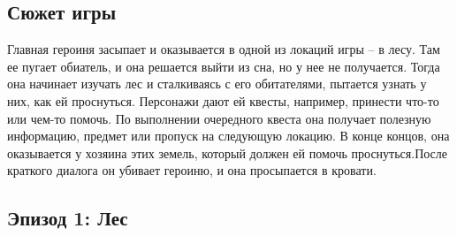 \subsection{Сюжет игры}

Главная героиня засыпает и оказывается в одной из локаций игры – в лесу. Там ее пугает обиатель, и она решается выйти из сна, но у нее не получается. Тогда она начинает изучать лес и сталкиваясь с его обитателями, пытается узнать у них, как ей проснуться. Персонажи дают ей квесты, например, принести что-то или чем-то помочь. По выполнении очередного квеста она получает полезную информацию, предмет или пропуск на следующую локацию. В конце концов, она оказывается у хозяина этих земель, который должен ей помочь проснуться.После краткого диалога он убивает героиню, и она просыпается в кровати.

\subsection{Эпизод 1: Лес}


